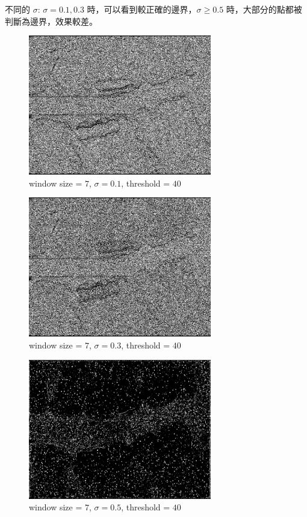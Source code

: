 \documentclass[conference]{IEEEtran}
\begin{document}
不同的 $\sigma$: $\sigma=0.1,0.3$ 時，可以看到較正確的邊界，$\sigma\geq 0.5$ 時，大部分的點都被判斷為邊界，效果較差。


\begin{figure}[H]
\centerline{\includegraphics[width=8cm]{dentalXray04.png}}
\caption{window size = $7$, $\sigma=0.1$,  threshold = $40$}
\label{dentalXray04}
\end{figure}

\begin{figure}[H]
\centerline{\includegraphics[width=8cm]{dentalXray05.png}}
\caption{window size = $7$, $\sigma=0.3$,  threshold = $40$}
\label{dentalXray05}
\end{figure}

\begin{figure}[H]
\centerline{\includegraphics[width=8cm]{dentalXray06.png}}
\caption{window size = $7$, $\sigma=0.5$,  threshold = $40$}
\label{dentalXray06}
\end{figure}
\end{document}
